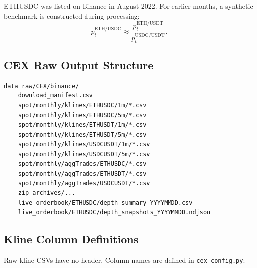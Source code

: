 \documentclass[11pt,a4paper]{article}
\begin{document}
ETHUSDC was listed on Binance in August 2022. For earlier months, a synthetic benchmark is constructed during processing:
\[
  p^{\mathrm{ETH/USDC}}_t \approx \frac{p^{\mathrm{ETH/USDT}}_t}{p^{\mathrm{USDC/USDT}}_t}.
\]

\subsection{CEX Raw Output Structure}

\begin{lstlisting}
data_raw/CEX/binance/
    download_manifest.csv
    spot/monthly/klines/ETHUSDC/1m/*.csv
    spot/monthly/klines/ETHUSDC/5m/*.csv
    spot/monthly/klines/ETHUSDT/1m/*.csv
    spot/monthly/klines/ETHUSDT/5m/*.csv
    spot/monthly/klines/USDCUSDT/1m/*.csv
    spot/monthly/klines/USDCUSDT/5m/*.csv
    spot/monthly/aggTrades/ETHUSDC/*.csv
    spot/monthly/aggTrades/ETHUSDT/*.csv
    spot/monthly/aggTrades/USDCUSDT/*.csv
    zip_archives/...
    live_orderbook/ETHUSDC/depth_summary_YYYYMMDD.csv
    live_orderbook/ETHUSDC/depth_snapshots_YYYYMMDD.ndjson
\end{lstlisting}

\subsection{Kline Column Definitions}

Raw kline CSVs have no header. Column names are defined in \texttt{cex\_config.py}:
\end{document}
